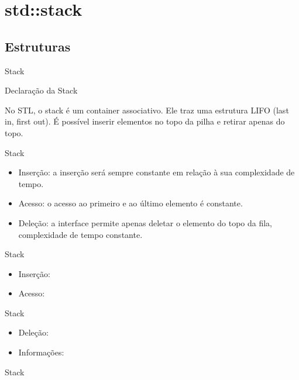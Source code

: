 \section{std::stack}

\subsection{Estruturas}

\begin{frame}[fragile]{Stack}

    \begin{block}{Declaração da Stack}
    \end{block}
	
    No STL, o stack é um container associativo. Ele traz uma estrutura LIFO (last in, first out). É possível inserir elementos no topo da pilha e retirar apenas do topo.
    
\end{frame}

\begin{frame}[fragile]{Stack}

    \begin{itemize}
        \item Inserção: a inserção será sempre constante em relação à sua complexidade de tempo.
        \item Acesso: o acesso ao primeiro e ao último elemento é constante.
        \item Deleção: a interface permite apenas deletar o elemento do topo da fila, complexidade de tempo constante.
    \end{itemize}

\end{frame}

\begin{frame}[fragile]{Stack}

    \begin{itemize}
        \item Inserção:
        \item Acesso:
    \end{itemize}

\end{frame}

\begin{frame}[fragile]{Stack}

    \begin{itemize}
        \item Deleção:
        \item Informações:
    \end{itemize}

\end{frame}

\begin{frame}[fragile]{Stack}


\end{frame}
